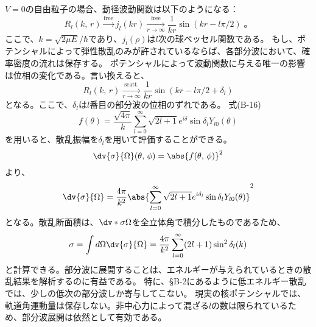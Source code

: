 \documentclass[a4paper,11pt,uplatex]{jsarticle}
\begin{document}
$V=0$の自由粒子の場合、動径波動関数は以下のようになる：
\begin{equation}
  R_l(k,\,r)\xrightarrow[]{\text{free}} j_l(kr)\xrightarrow[r\to\infty]{\text{free}} \frac{1}{kr}\sin(kr-l\pi/2)\;。
\end{equation}
ここで、$k=\sqrt{2\mu E}/\hbar$であり、$j_l(\rho)$は$l$次の球ベッセル関数である。
もし、ポテンシャルによって弾性散乱のみが許されているならば、各部分波において、確率密度の流れは保存する。
ポテンシャルによって波動関数に与える唯一の影響は位相の変化である。言い換えると、
\begin{equation}
  R_l(k,\,r)\xrightarrow[r\to\infty]{\text{scatt.}} \frac{1}{kr}\sin(kr-l\pi/2+\delta_l)
\end{equation}
となる。ここで、$\delta_l$は$l$番目の部分波の位相のずれである。
式(B-16)
\begin{equation}
  f(\theta)=\frac{\sqrt{4\pi}}{k}\sum_{l=0}^{\infty}\sqrt{2l+1}e^{i\delta}\sin\delta_l Y_{l0}(\theta)
\end{equation}
を用いると、散乱振幅を$\delta_l$を用いて評価することができる。
\begin{equation}
  \dv{\sigma}{\Omega}(\theta,\,\phi)=\abs{f(\theta,\,\phi)}^2
\end{equation}
より、
\begin{equation}
  \dv{\sigma}{\Omega} = \frac{4\pi}{k^2}\abs{\sum_{l=0}^{\infty}\sqrt{2l+1}e^{i\delta_l}\sin\delta_l Y_{l0}(\theta)}^2
\end{equation}
となる。散乱断面積は、$\dv*{\sigma}{\Omega}$を全立体角で積分したものであるため、
\begin{equation}
  \sigma=\int d\Omega \dv{\sigma}{\Omega} = \frac{4\pi}{k^2}\sum_{l=0}^{\infty}(2l+1)\sin^2\delta_l(k)
\end{equation}
と計算できる。部分波に展開することは、エネルギーが与えられているときの散乱結果を解析するのに有益である。
特に、\S{B-2}にあるように低エネルギー散乱では、少しの低次の部分波しか寄与してこない。
現実の核ポテンシャルでは、軌道角運動量は保存しない。非中心力によって混ざる$l$の数は限られているため、部分波展開は依然として有効である。
\end{document}
